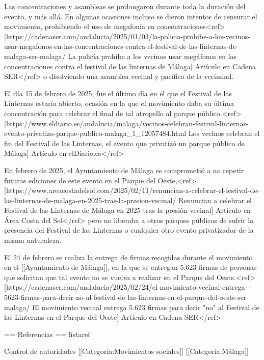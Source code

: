 Las concentraciones y asambleas se prolongaron durante toda la duración del evento, y más allá. En algunas ocasiones incluso se dieron intentos de censurar el movimiento, prohibiendo el uso de megafonía en concentraciones<ref>[https://cadenaser.com/andalucia/2025/01/03/la-policia-prohibe-a-los-vecinos-usar-megafonos-en-las-concentraciones-contra-el-festival-de-las-linternas-de-malaga-ser-malaga/ La policía prohíbe a los vecinos usar megáfonos en las concentraciones contra el festival de las linternas de Málaga] Artículo en Cadena SER</ref> o disolviendo una asamblea vecinal y pacífica de la vecindad.

El día 15 de febrero de 2025, fue el último día en el que el Festival de las Linternas estaría abierto, ocasión en la que el movimiento daba su última concentración para celebrar el final de tal atropello al parque público.<ref>[https://www.eldiario.es/andalucia/malaga/vecinos-celebran-festival-linternas-evento-privatizo-parque-publico-malaga_1_12057484.html Los vecinos celebran el fin del Festival de las Linternas, el evento que privatizó un parque público de Málaga] Artículo en elDiario.es</ref>

En febrero de 2025, el Ayuntamiento de Málaga se comprometió a no repetir futuras ediciones de este evento en el Parque del Oeste,<ref>[https://www.areacostadelsol.com/2025/02/11/renuncian-a-celebrar-el-festival-de-las-linternas-de-malaga-en-2025-tras-la-presion-vecinal/ Renuncian a celebrar el Festival de las Linternas de Málaga en 2025 tras la presión vecinal] Artículo en Área Costa del Sol</ref> pero no liberaba a otros parques públicos de sufrir la presencia del Festival de las Linternas o cualquier otro evento privatizador de la misma naturaleza.

El 24 de febrero se realiza la entrega de firmas recogidas durante el movimiento en el [[Ayuntamiento de Málaga]], en la que se entregan 5.623 firmas de personas que solicitan que tal evento no se vuelva a realizar en el Parque del Oeste.<ref>[https://cadenaser.com/andalucia/2025/02/24/el-movimiento-vecinal-entrega-5623-firmas-para-decir-no-al-festival-de-las-linternas-en-el-parque-del-oeste-ser-malaga/ El movimiento vecinal entrega 5.623 firmas para decir "no" al Festival de las Linternas en el Parque del Oeste] Artículo en Cadena SER</ref>

== Referencias ==
{{listaref}}

{{Control de autoridades}}
[[Categoría:Movimientos sociales]]
[[Categoría:Málaga]]
